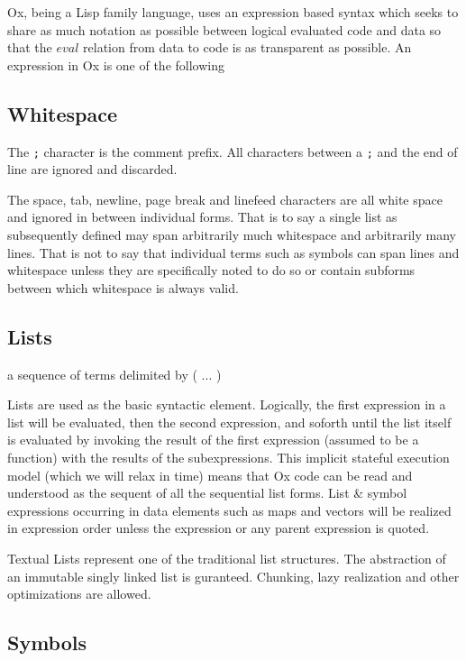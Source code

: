 \documentclass{report}
\begin{document}
Ox, being a Lisp family language, uses an expression based syntax which seeks to
share as much notation as possible between logical evaluated code and data so
that the $eval$ relation from data to code is as transparent as possible. An
expression in Ox is one of the following



\subsection{Whitespace}

The \verb|;| character is the comment prefix. All characters between a
\verb|;| and the end of line are ignored and discarded.

The space, tab, newline, page break and linefeed characters are all white
space and ignored in between individual forms. That is to say a single list as
subsequently defined may span arbitrarily much whitespace and arbitrarily many
lines. That is not to say that individual terms such as symbols can span lines
and whitespace unless they are specifically noted to do so or contain subforms
between which whitespace is always valid.

\subsection{Lists}

a sequence of terms delimited by ( ... )

Lists are used as the basic syntactic element. Logically, the first expression
in a list will be evaluated, then the second expression, and soforth until the
list itself is evaluated by invoking the result of the first expression
(assumed to be a function) with the results of the subexpressions. This
implicit stateful execution model (which we will relax in time) means that Ox
code can be read and understood as the sequent of all the sequential list
forms. List \& symbol expressions occurring in data elements such as maps and
vectors will be realized in expression order unless the expression or any
parent expression is quoted.

Textual Lists represent one of the traditional list structures. The
abstraction of an immutable singly linked list is guranteed. Chunking, lazy
realization and other optimizations are allowed.

\subsection{Symbols}
\end{document}

